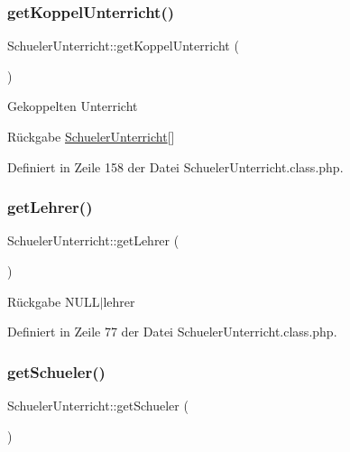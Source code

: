 \subsubsection{\texorpdfstring{get\+Koppel\+Unterricht()}{getKoppelUnterricht()}}
{\footnotesize\ttfamily Schueler\+Unterricht\+::get\+Koppel\+Unterricht (\begin{DoxyParamCaption}{ }\end{DoxyParamCaption})}

Gekoppelten Unterricht \begin{DoxyReturn}{Rückgabe}
\mbox{\hyperlink{class_schueler_unterricht}{Schueler\+Unterricht}}\mbox{[}\mbox{]} 
\end{DoxyReturn}


Definiert in Zeile 158 der Datei Schueler\+Unterricht.\+class.\+php.

\mbox{\label{class_schueler_unterricht_ad1076fb3dcd92496168563af63642cbd}} 
\subsubsection{\texorpdfstring{get\+Lehrer()}{getLehrer()}}
{\footnotesize\ttfamily Schueler\+Unterricht\+::get\+Lehrer (\begin{DoxyParamCaption}{ }\end{DoxyParamCaption})}

\begin{DoxyReturn}{Rückgabe}
N\+U\+L\+L$\vert$lehrer 
\end{DoxyReturn}


Definiert in Zeile 77 der Datei Schueler\+Unterricht.\+class.\+php.

\mbox{\label{class_schueler_unterricht_a58a9398c18546bf70e74081527bbe46f}} 
\subsubsection{\texorpdfstring{get\+Schueler()}{getSchueler()}}
{\footnotesize\ttfamily Schueler\+Unterricht\+::get\+Schueler (\begin{DoxyParamCaption}{ }\end{DoxyParamCaption})}


